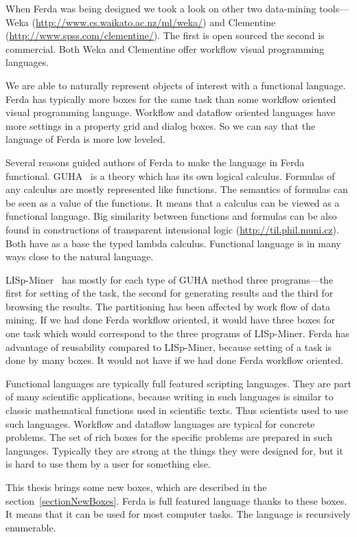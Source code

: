 \documentclass[a4paper,12pt]{book}
\begin{document}
When Ferda was being designed we took a look on other two data-mining tools---Weka (\url{http://www.cs.waikato.ac.nz/ml/weka/}) and Clementine (\url{http://www.spss.com/clementine/}). The first is open sourced the second is commercial. Both Weka and Clementine offer workflow visual programming languages.

We are able to naturally represent objects of interest with a functional language. Ferda has typically more boxes for the same task than some workflow oriented visual programming language. Workflow and dataflow oriented languages have more settings in a property grid and dialog boxes. So we can say that the language of Ferda is more low leveled.

Several reasons guided authors of Ferda to make the language in Ferda functional. GUHA~\cite{GUHAbook} is a theory which has its own logical calculus. Formulas of any calculus are mostly represented like functions. The semantics of formulas can be seen as a value of the functions. It means that a calculus can be viewed as a functional language. Big similarity between functions and formulas can be also found in constructions of transparent intensional logic (\url{http://til.phil.muni.cz}). Both have as a base the typed lambda calculus. Functional language is in many ways close to the natural language. 

LISp-Miner~\cite{LISp-Miner} has mostly for each type of GUHA method three programs---the first for setting of the task, the second for generating results and the third for browsing the results. The partitioning has been affected by work flow of data mining. If we had done Ferda workflow oriented, it would have three boxes for one task which would correspond to the three programs of LISp-Miner. Ferda has advantage of reusability compared to LISp-Miner, because setting of a task is done by many boxes. It would not have if we had done Ferda workflow oriented. 

Functional languages are typically full featured scripting languages. They are part of many scientific applications, because writing in such languages is similar to classic mathematical functions used in scientific texts. Thus scientists used to use such languages. Workflow and dataflow languages are typical for concrete problems. The set of rich boxes for the specific problems are prepared in such languages. Typically they are strong at the things they were designed for, but it is hard to use them by a user for something else.

This thesis brings some new boxes, which are described in the section~\ref{sectionNewBoxes}. Ferda is full featured language thanks to these boxes. It means that it can be used for most computer tasks. The language is recursively enumerable.
\end{document}
